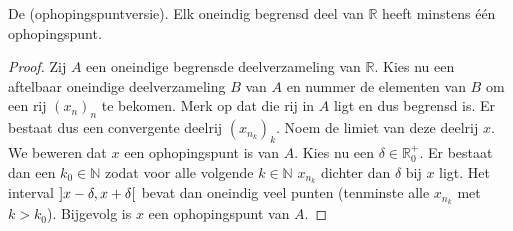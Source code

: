 \documentclass[main.tex]{subfiles}
\begin{document}
\begin{st}
  De  (ophopingspuntversie).
  Elk oneindig begrensd deel van $\mathbb{R}$ heeft minstens \'e\'en ophopingspunt.

  \begin{proof}
    Zij $A$ een oneindige begrensde deelverzameling van $\mathbb{R}$.
    Kies nu een aftelbaar oneindige deelverzameling $B$ van $A$ en nummer de elementen van $B$ om een rij $(x_{n})_{n}$ te bekomen.
    Merk op dat die rij in $A$ ligt en dus begrensd is.
    Er bestaat dus een convergente deelrij $(x_{n_{k}})_{k}$.
    Noem de limiet van deze deelrij $x$.
    We beweren dat $x$ een ophopingspunt is van $A$.
    Kies nu een $\delta \in \mathbb{R}_{0}^{+}$.
    Er bestaat dan een $k_{0}\in\mathbb{N}$ zodat voor alle volgende $k\in \mathbb{N}$ $x_{n_{k}}$ dichter dan $\delta$ bij $x$ ligt.
    Het interval $\interval[open]{x-\delta}{x+\delta}$ bevat dan oneindig veel punten (tenminste alle $x_{n_{k}}$ met $k>k_{0}$).
    Bijgevolg is $x$ een ophopingspunt van $A$.
  \end{proof}
\end{st}
\end{document}
